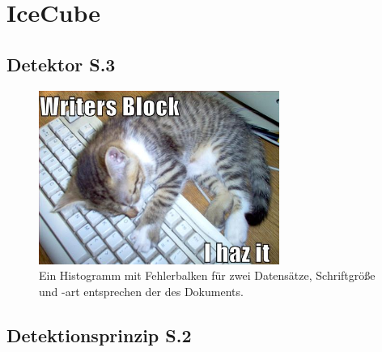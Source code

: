 \thispagestyle{plain}
\chapter{IceCube}

\section{Detektor S.3}
\begin{figure}[!h]
    \centering
    \includegraphics[width=0.7\textwidth]{./Plots/dummy.png}
    \caption{Ein Histogramm mit Fehlerbalken für zwei Datensätze, Schriftgröße und -art entsprechen der des Dokuments.}
    \label{fig:bsp}
\end{figure}
\section{Detektionsprinzip S.2}
